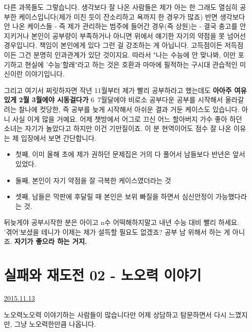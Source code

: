 다른 과목들도 그렇습니다. 생각보다 잘 나온 사람들은 제가 아는 한 그래도 열심히 공부한 케이스입니다(제가 미친 듯이 잔소리하고 욕까지 한 경우가 많죠)
반면 생각보다 안 나온 케이스들 - 즉 제가 관리하는 범주에 들어간 경우(즉 상원)는 -
결국 충고를 안 지키거나 본인이 공부량이 부족하거나 아니면 위에서 얘기한 자기의 약점을 못 넘어선 경우입니다.
책임이 본인에게 있다 그런 걸 강조하는 게 아닙니다. 고득점이든 저득점이든 그건 분명히 인과관계가 있단 것이지요.
따라서 "나는 수능에 안 맞나봐, 이만 포기하고 현실에 '수능'할래"라고 하는 것은 호환과 마마에 필적하는 구시대 관습적인 미신이란 이야기입니다.
\vspace{5mm}

그리고 여기서 찌릿하자면 작년 11월부터 제가 빨리 공부하라고 했는데도
\textbf{아아주 여유있게 2월 3월에야 시동걸다가} 6~7월달에야 비로소 공부다운 공부를 시작해서 올라갈려는 찰나에 컷당한,
즉 공부를 늦게 시작해서 아쉬운 결과 거둔 케이스도 있습니다. 아니 사실 이게 많을 거예요.
어제 챗방에서 어그로 끄신 어느 할아버지 가수 좋아 하던 소녀는 자기가 놀았다고 하지만 이건 기만질이죠.
이 분 현역이어도 점수 잘 나온 이유는 제 입장에서 보면 간단합니다.
\begin{itemize}
    \item 첫째, 이미 올해 초에 제가 권하던 문제집은 거의 다 풀어서 남들보다 반년은 앞서있었다.
    \item 둘째, 본인이 자기 약점을 잘 극복한 케이스였더라는 것
    \item 셋째, 남들은 막판에 후달릴 때 본인은 보위 빠질을 하면서 심신안정이 가능했다라는 것.
\end{itemize}
\vspace{5mm}

뒤늦게야 공부시작한 분은 아이고 n수 어떡해하지말고 내년 수능 대비 빨리 하세요. '겪어'보셨을 테니가 이제는 제가 설득할 필요도 없겠죠?
공부 남 위해서 하는 게 아니죠. \textbf{자기가 좋으라 하는 거지.}
\vspace{5mm}






\section{실패와 재도전 02 - 노오력 이야기}
\href{https://www.kockoc.com/Apoc/481647}{2015.11.13}

\vspace{5mm}

노오력노오력 이야기하는 사람들이 많습니다만
어제 상담하고 탐문하면서 다시 느꼈지만, 그냥 노오력한만큼 나옵니다.
\vspace{5mm}

